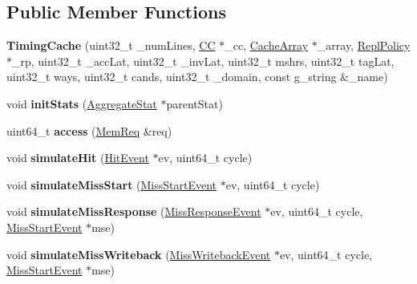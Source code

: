 \subsection*{Public Member Functions}
\begin{DoxyCompactItemize}
\item 
\hypertarget{classTimingCache_a862b430cb85b75ddf4bbb8038f7c15e5}{{\bfseries Timing\-Cache} (uint32\-\_\-t \-\_\-num\-Lines, \hyperlink{classCC}{C\-C} $\ast$\-\_\-cc, \hyperlink{classCacheArray}{Cache\-Array} $\ast$\-\_\-array, \hyperlink{classReplPolicy}{Repl\-Policy} $\ast$\-\_\-rp, uint32\-\_\-t \-\_\-acc\-Lat, uint32\-\_\-t \-\_\-inv\-Lat, uint32\-\_\-t mshrs, uint32\-\_\-t tag\-Lat, uint32\-\_\-t ways, uint32\-\_\-t cands, uint32\-\_\-t \-\_\-domain, const g\-\_\-string \&\-\_\-name)}\label{classTimingCache_a862b430cb85b75ddf4bbb8038f7c15e5}

\item 
\hypertarget{classTimingCache_a9583021c6cd082d567a4b9e7f41ab2f6}{void {\bfseries init\-Stats} (\hyperlink{classAggregateStat}{Aggregate\-Stat} $\ast$parent\-Stat)}\label{classTimingCache_a9583021c6cd082d567a4b9e7f41ab2f6}

\item 
\hypertarget{classTimingCache_abb38c207c0421313352ba62bda3d6ac1}{uint64\-\_\-t {\bfseries access} (\hyperlink{structMemReq}{Mem\-Req} \&req)}\label{classTimingCache_abb38c207c0421313352ba62bda3d6ac1}

\item 
\hypertarget{classTimingCache_ae98f61c668a3cdf2bad116e15af963a0}{void {\bfseries simulate\-Hit} (\hyperlink{classHitEvent}{Hit\-Event} $\ast$ev, uint64\-\_\-t cycle)}\label{classTimingCache_ae98f61c668a3cdf2bad116e15af963a0}

\item 
\hypertarget{classTimingCache_ac32b5bc9d2b3a18e551bba9e3a332242}{void {\bfseries simulate\-Miss\-Start} (\hyperlink{classMissStartEvent}{Miss\-Start\-Event} $\ast$ev, uint64\-\_\-t cycle)}\label{classTimingCache_ac32b5bc9d2b3a18e551bba9e3a332242}

\item 
\hypertarget{classTimingCache_a77a6afaecb3c06558bd36cb0cfee02ac}{void {\bfseries simulate\-Miss\-Response} (\hyperlink{classMissResponseEvent}{Miss\-Response\-Event} $\ast$ev, uint64\-\_\-t cycle, \hyperlink{classMissStartEvent}{Miss\-Start\-Event} $\ast$mse)}\label{classTimingCache_a77a6afaecb3c06558bd36cb0cfee02ac}

\item 
\hypertarget{classTimingCache_a34fb792dcc77dfe79ba6728742748826}{void {\bfseries simulate\-Miss\-Writeback} (\hyperlink{classMissWritebackEvent}{Miss\-Writeback\-Event} $\ast$ev, uint64\-\_\-t cycle, \hyperlink{classMissStartEvent}{Miss\-Start\-Event} $\ast$mse)}\label{classTimingCache_a34fb792dcc77dfe79ba6728742748826}


\end{DoxyCompactItemize}
